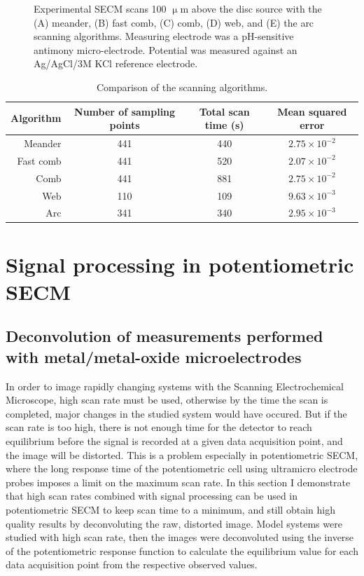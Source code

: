 \begin{figure}[H]
\caption[Experimental SECM scans 100 $\upmu$m above the disc source.]{Experimental SECM scans 100 $\upmu$m above the disc source with the (A) meander, (B) fast comb, (C) comb, (D) web, and (E) the arc scanning algorithms.
Measuring electrode was a pH-sensitive antimony micro-electrode.
Potential was measured against an Ag/AgCl/3M KCl reference electrode.}
\label{fig:measurements}
\end{figure}

\begin{table}
                \caption{Comparison of the scanning algorithms.}
                \label{table:comp}
                \centering
                \begin{tabular}{r c c c}
                        Algorithm & Number of sampling points & Total scan time (s) & Mean squared error \\
                        \hline
                        Meander & 441 & 440 & $2.75\times 10^{-2}$ \\
                        Fast comb & 441 & 520  & $2.07\times 10^{-2}$ \\
                        Comb & 441 & 881 & $2.75\times 10^{-2}$ \\
                        Web & 110 & 109 & $9.63\times 10^{-3}$ \\
			Arc & 341 & 340 & $2.95\times 10^{-3}$ \\
                \end{tabular}
\end{table}

	\newpage
	\section{Signal processing in potentiometric SECM}
	\label{dec_result}

		\subsection{Deconvolution of measurements performed with metal/metal-oxide microelectrodes}
In order to image rapidly changing systems with the Scanning Electrochemical Microscope, high scan rate must be used, otherwise by the time the scan is completed, major changes in the studied system would have occured.
But if the scan rate is too high, there is not enough time for the detector to reach equilibrium before the signal is recorded at a given data acquisition point, and the image will be distorted.
This is a problem especially in potentiometric SECM, where the long response time of the potentiometric cell using ultramicro electrode probes imposes a limit on the maximum scan rate.
In this section I demonstrate that high scan rates combined with signal processing can be used in potentiometric SECM to keep scan time to a minimum, and still obtain high quality results by deconvoluting the raw, distorted image.
Model systems were studied with high scan rate, then the images were deconvoluted using the inverse of the potentiometric response function to calculate the equilibrium value for each data acquisition point from the respective observed values.

